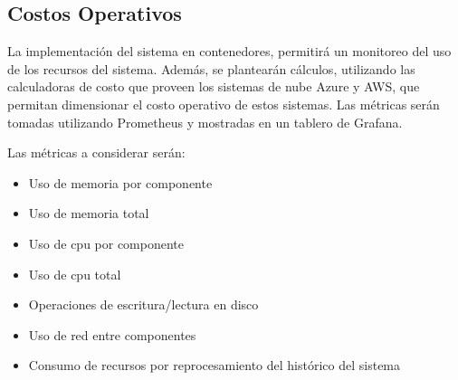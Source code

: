 \subsection{Costos Operativos}

La implementación del sistema en contenedores, permitirá un monitoreo del uso de los recursos del sistema.
Además, se plantearán cálculos, utilizando las calculadoras de costo que proveen los sistemas de nube Azure y AWS, que permitan dimensionar el costo operativo de estos sistemas.
Las métricas serán tomadas utilizando Prometheus y mostradas en un tablero de Grafana.

Las métricas a considerar serán:
\begin{itemize}
    \item Uso de memoria por componente
    \item Uso de memoria total
    \item Uso de cpu por componente
    \item Uso de cpu total
    \item Operaciones de escritura/lectura en disco
    \item Uso de red entre componentes
    \item Consumo de recursos por reprocesamiento del histórico del sistema
\end{itemize}